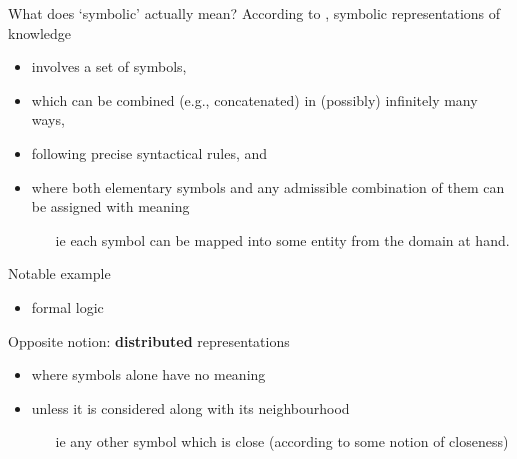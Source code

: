 \documentclass[presentation]{beamer}\mode<presentation>{\usetheme{AMSBolognaFC}}
\begin{document}
\begin{frame}[allowframebreaks]{What does `symbolic' actually mean?}
    According to \cite{Gelder90}, \alert{symbolic} representations of knowledge
    \begin{itemize}
        \item involves a \alert{set of symbols},
        \item which can be combined (e.g., concatenated) in (possibly) \alert{infinitely many} ways, 
        \item following precise \alert{syntactical} rules, and
        \item where both elementary symbols and any admissible combination of them can be assigned with \alert{meaning}
        \begin{itemize}
            \item[ie] \alert{each} symbol can be mapped into some entity from the domain at hand.
        \end{itemize}
    \end{itemize}
    
    \begin{exampleblock}{Notable example}
        \begin{itemize}
            \item formal logic
        \end{itemize}
    \end{exampleblock}

    \framebreak

    \begin{alertblock}{Opposite notion: \textbf{distributed} representations}
        \begin{itemize}
            \item where symbols \alert{alone} have no meaning
            \item unless it is considered along with its \alert{neighbourhood}
            \begin{itemize}
                \item[ie] any other symbol which is \alert{close} (according to some notion of closeness)
            \end{itemize}
        \end{itemize}
    \end{alertblock}
\end{frame}

%     
\end{document}
